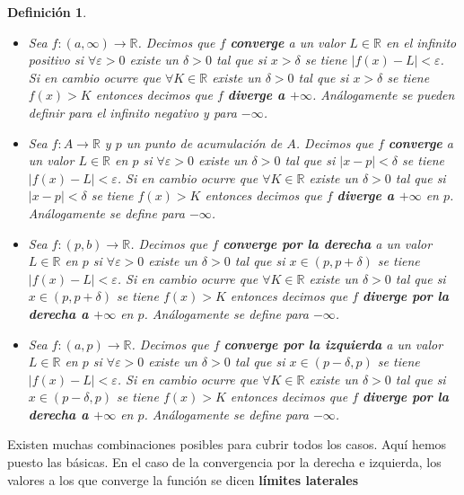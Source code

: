 \documentclass{article}
\newtheorem{define}{Definición}
\newcommand{\reales}{\mathbb{R}}
\begin{document}
\begin{define}
	\begin{itemize}
		\item
		Sea $f: (a, \infty) \rightarrow \reales$. Decimos que $f$ \textbf{converge} a un valor $L\in \reales$ en el infinito positivo si $\forall \varepsilon > 0$ existe un $\delta > 0$ tal que si $x > \delta$ se tiene $|f(x) - L| < \varepsilon$. Si en cambio ocurre que $\forall K \in \reales$ existe un $\delta > 0$ tal que si $x > \delta$ se tiene $f(x) > K$ entonces decimos que $f$ \textbf{diverge a $+\infty$}. Análogamente se pueden definir para el infinito negativo y para $-\infty$.
		\item
		Sea $f: A \rightarrow \reales$ y $p$ un punto de acumulación de $A$. Decimos que $f$ \textbf{converge} a un valor $L\in \reales$ en $p$ si $\forall \varepsilon > 0$ existe un $\delta > 0$ tal que si $|x - p| < \delta$ se tiene $|f(x) - L| < \varepsilon$. Si en cambio ocurre que $\forall K \in \reales$ existe un $\delta > 0$ tal que si $|x - p| < \delta$ se tiene $f(x) > K$ entonces decimos que $f$ \textbf{diverge a $+\infty$} en $p$. Análogamente se define para $-\infty$.
		\item
		Sea $f: (p, b) \rightarrow \reales$. Decimos que $f$ \textbf{converge por la derecha} a un valor $L \in \reales$ en $p$ si $\forall \varepsilon > 0$ existe un $\delta > 0$ tal que si $x \in (p, p + \delta)$ se tiene $|f(x) - L| < \varepsilon$. Si en cambio ocurre que $\forall K \in \reales$ existe un $\delta > 0$ tal que si $x \in (p, p + \delta)$ se tiene $f(x) > K$ entonces decimos que $f$ \textbf{diverge por la derecha a $+\infty$} en $p$. Análogamente se define para $-\infty$.		
		\item
		Sea $f: (a, p) \rightarrow \reales$. Decimos que $f$ \textbf{converge por la izquierda} a un valor $L \in \reales$ en $p$ si $\forall \varepsilon > 0$ existe un $\delta > 0$ tal que si $x \in (p - \delta, p)$ se tiene $|f(x) - L| < \varepsilon$. Si en cambio ocurre que $\forall K \in \reales$ existe un $\delta > 0$ tal que si $x \in (p - \delta, p)$ se tiene $f(x) > K$ entonces decimos que $f$ \textbf{diverge por la derecha a $+\infty$} en $p$. Análogamente se define para $-\infty$.
	\end{itemize}
\end{define}

Existen muchas combinaciones posibles para cubrir todos los casos. Aquí hemos puesto las básicas. En el caso de la convergencia por la derecha e izquierda, los valores a los que converge la función se dicen \textbf{límites laterales}
\end{document}
